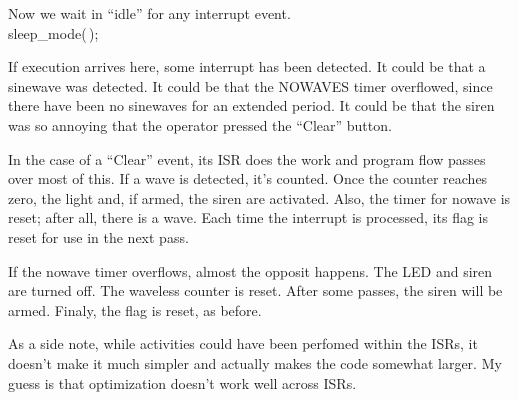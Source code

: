 Now we wait in ``idle'' for any interrupt event.
\Y\B\\{sleep\_mode}(\,);\par
\fi

If execution arrives here, some interrupt has been detected.
It could be that a sinewave was detected.
It could be that the NOWAVES timer overflowed, since there have been no
sinewaves for an extended period.
It could be that the siren was so annoying that the operator pressed the
``Clear'' button.

In the case of a ``Clear'' event, its ISR does the work and program flow passes
over most of this.
If a wave is detected, it's counted. Once the counter reaches zero, the light
and, if armed, the siren are activated. Also, the timer for nowave is reset;
after all, there is a wave. Each time the interrupt is processed, its flag is
reset for use in the next pass.

If the nowave timer overflows, almost the opposit happens. The LED and siren
are turned off. The waveless counter is reset. After some passes, the siren
will be armed. Finaly, the flag is reset, as before.

As a side note, while activities could have been perfomed within the ISRs, it
doesn't make it much simpler and actually makes the code somewhat larger.
My guess is that optimization doesn't work well across ISRs.

